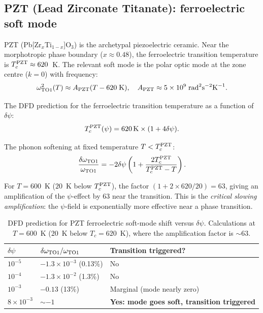 \documentclass[11pt]{article}
\newcommand{\ee}[1]{\times 10^{#1}}
\begin{document}
\subsection{PZT (Lead Zirconate Titanate): ferroelectric soft mode}

PZT (Pb[Zr$_x$Ti$_{1-x}$]O$_3$) is the archetypal piezoelectric ceramic.
Near the morphotropic phase boundary ($x \approx 0.48$), the ferroelectric
transition temperature is $T_c^{\rm PZT} \approx 620$~K. The relevant soft
mode is the polar optic mode at the zone centre ($k = 0$) with frequency:
\begin{equation}
\omega_{\rm TO1}^2(T) \approx A_{\rm PZT}(T - 620\;\text{K}),
\quad A_{\rm PZT} \approx 5\ee{9}\;\text{rad}^2\text{s}^{-2}\text{K}^{-1}.
\label{eq:PZT-soft}
\end{equation}

The DFD prediction for the ferroelectric transition temperature as a
function of $\delta\psi$:
\begin{equation}
T_c^{\rm PZT}(\psi) = 620\,\text{K} \times (1 + 4\delta\psi).
\label{eq:PZT-Tc}
\end{equation}

The phonon softening at fixed temperature $T < T_c^{\rm PZT}$:
\begin{equation}
\frac{\delta\omega_{\rm TO1}}{\omega_{\rm TO1}}
= -2\delta\psi\left(1 + \frac{2T_c^{\rm PZT}}{T_c^{\rm PZT} - T}\right).
\label{eq:PZT-softening}
\end{equation}

For $T = 600$~K ($20$~K below $T_c^{\rm PZT}$), the factor
$(1 + 2 \times 620/20) = 63$, giving an amplification of the $\psi$-effect
by 63 near the transition. This is the \emph{critical slowing amplification}:
the $\psi$-field is exponentially more effective near a phase transition.

\begin{table}[h]
\centering
\caption{DFD prediction for PZT ferroelectric soft-mode shift versus $\delta\psi$.
Calculations at $T = 600$~K ($20$~K below $T_c = 620$~K), where the amplification
factor is $\sim 63$.}
\label{tab:PZT}
\begin{tabular}{lll}
\toprule
$\delta\psi$ & $\delta\omega_{\rm TO1}/\omega_{\rm TO1}$ & Transition triggered? \\
\midrule
$10^{-5}$ & $-1.3\ee{-3}$ (0.13\%) & No \\
$10^{-4}$ & $-1.3\ee{-2}$ (1.3\%) & No \\
$10^{-3}$ & $-0.13$ (13\%) & Marginal (mode nearly zero) \\
$8\ee{-3}$ & $\sim -1$ & \textbf{Yes: mode goes soft, transition triggered} \\
\bottomrule
\end{tabular}
\end{table}
\end{document}
